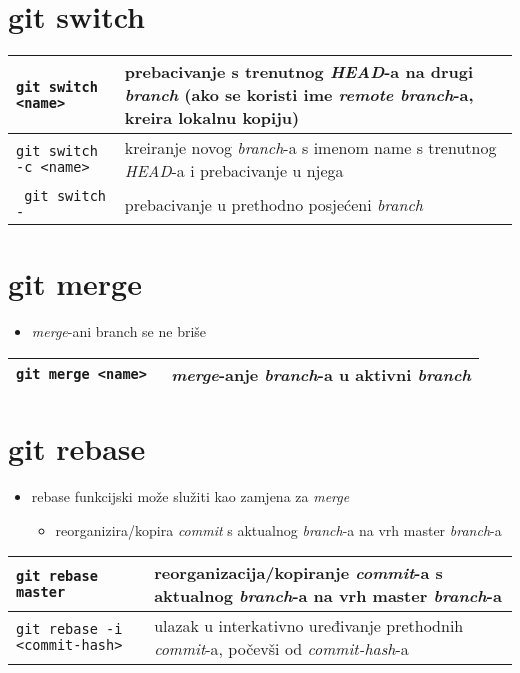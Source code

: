 \documentclass[10pt]{article}
\begin{document}
    \section*{git switch}
    \begin{tabular}{|>{\tt}p{9.00cm}|>{}p{15.50cm}|}
        \hline
        git switch <name>                               & prebacivanje s trenutnog \textit{HEAD}-a na drugi \textit{branch} (ako se koristi ime \textit{remote branch}-a, kreira lokalnu kopiju) \\ \hline
        git switch -c <name>                            & kreiranje novog \textit{branch}-a s imenom name s trenutnog \textit{HEAD}-a i prebacivanje u njega \\ \hline
        git switch -                                    & prebacivanje u prethodno posjećeni \textit{branch} \\ \hline
    \end{tabular}

    \section*{git merge}
    \begin{itemize}
        \item \textit{merge}-ani branch se ne briše
    \end{itemize}
    \begin{tabular}{|>{\tt}p{9.00cm}|>{}p{15.50cm}|}
        \hline
        git merge <name>                                & \textit{merge}-anje \textit{branch}-a u aktivni \textit{branch} \\ \hline
    \end{tabular}

    \section*{git rebase}
    \begin{itemize}
        \item rebase funkcijski može služiti kao zamjena za \textit{merge}
        \begin{itemize}
            \item reorganizira/kopira \textit{commit} s aktualnog \textit{branch}-a na vrh master \textit{branch}-a
        \end{itemize}
    \end{itemize}
    \begin{tabular}{|>{\tt}p{9.00cm}|>{}p{15.50cm}|}
        \hline
        git rebase master                               & reorganizacija/kopiranje \textit{commit}-a s aktualnog \textit{branch}-a na vrh master \textit{branch}-a \\ \hline
        git rebase -i <commit-hash>                     & ulazak u interkativno uređivanje prethodnih \textit{commit}-a, počevši od \textit{commit-hash}-a \\ \hline
    \end{tabular}
\end{document}
